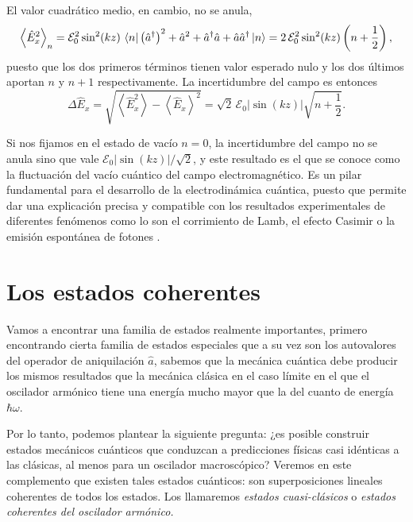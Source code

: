         El valor cuadrático medio, en cambio, no se anula,
        \begin{equation}
            \left\langle \hat{E}^{2}_{x}\right\rangle_{n} = \mathcal{E}_{0}^{2}\sin^{2}(kz)\,\bra{n}\left(\hat{a}^{\dagger}\right)^{2} + \hat{a}^{2} + \hat{a}^{\dagger}\hat{a} + \hat{a}\hat{a}^{\dagger}\ket{n} = 2\,\mathcal{E}_{0}^{2}\sin^{2}(kz)\left(n+ \frac{1}{2}\right),
        \end{equation}
        puesto que los dos primeros términos tienen valor esperado nulo y los dos últimos aportan $n$ y $n+1$ respectivamente. La incertidumbre del campo es entonces
        \begin{equation}
            \Delta \hat{E}_{x} = \sqrt{\left\langle \hat{E}^{2}_{x}\right\rangle - \left\langle \hat{E}_{x}\right\rangle^{2}} = \sqrt{2}\,\mathcal{E}_{0}\left|\sin(kz)\right|\sqrt{n+\frac{1}{2}} .
        \end{equation}

        Si nos fijamos en el estado de vacío $n = 0$, la incertidumbre del campo no se anula sino que vale $\mathcal{E}_{0}|\sin(kz)|/\sqrt{2}$, y este resultado es el que se conoce como la fluctuación del vacío cuántico del campo electromagnético. Es un pilar fundamental para el desarrollo de la electrodinámica cuántica, puesto que permite dar una explicación precisa y compatible con los resultados experimentales de diferentes fenómenos como lo son el corrimiento de Lamb, el efecto Casimir o la emisión espontánea de fotones \citep{Introd-QO}.

\section{Los estados coherentes}

    Vamos a encontrar una familia de estados realmente importantes, primero encontrando cierta familia de estados especiales que a su vez son los autovalores del operador de aniquilación $\hat{a}$, sabemos que la mecánica cuántica debe producir los mismos resultados que la mecánica clásica en el caso límite en el que el oscilador armónico tiene una energía mucho mayor que la del cuanto de energía $\hbar \omega$.

    Por lo tanto, podemos plantear la siguiente pregunta: ¿es posible construir estados mecánicos cuánticos que conduzcan a predicciones físicas casi idénticas a las clásicas, al menos para un oscilador macroscópico? Veremos en este complemento que existen tales estados cuánticos: son superposiciones lineales coherentes de todos los estados. Los llamaremos \textit{estados cuasi-clásicos} o \textit{estados coherentes del oscilador armónico.}

